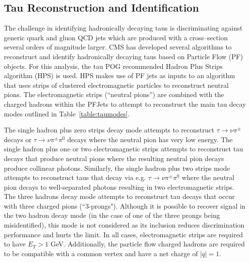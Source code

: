 \subsection{Tau Reconstruction and Identification}\label{sec:tauID}

The challenge in identifying hadronically decaying taus is discriminating against generic quark and gluon QCD jets 
which are produced with a cross--section several orders of magnitude larger. CMS has developed several algorithms to 
reconstruct and identify
hadronically decaying taus based on Particle Flow (PF) objects. For this analysis, the tau POG 
recommended Hadron Plus Strips algorithm (HPS) is used. HPS makes use of PF jets as 
inputs to an algorithm that uses strips of clustered electromagnetic particles to reconstruct neutral pions. The 
electromagnetic strips (``neutral pions'') are combined with the charged hadrons within the PFJets to attempt to 
reconstruct the main tau decay modes outlined in Table~\ref{table:taumodes}.

\begin{table}[ht]
  \caption{Reconstructed Tau Decay Modes}
  \label{table:taumodes} %
\end{table}

The single hadron plus zero strips decay mode attempts to reconstruct $\tau \to \nu\pi^{\pm}$ decays or $\tau \to 
\nu\pi^{\pm}\pi^{0}$ decays where the neutral pion has very low energy. The single hadron plus one or two 
electromagnetic strips attempts to reconstruct tau decays that produce neutral pions where the resulting neutral pion 
decays produce collinear photons. Similarly, the single hadron plus two strips mode attempts to reconstruct taus that 
decay via e.g. $\tau \to \nu\pi^{\pm}\pi^{0}$ where the neutral pion decays to well-separated photons resulting in two 
electromagnetic strips. The three hadrons decay mode attempts to reconstruct tau decays that occur with three charged pions (``3-prongs"). Although it is possible to recover signal in the two hadron decay mode (in the case of one of the
three prongs being misidentified), this mode is not considered as its inclusion reduces discrimination performance and 
hurts the limit. 
In all cases, electromagnetic strips are 
required to have $E_{T} > 1$ GeV. Additionally,
the particle flow charged hadrons are required to be compatible with a common 
vertex and have a net charge of $|q|=1$.

